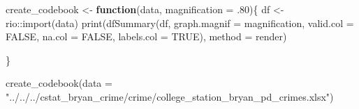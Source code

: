 \documentclass[
  letterpaper,
  DIV=11,
  numbers=noendperiod]{scrartcl}
\newenvironment{Shaded}{\begin{snugshade}}{\end{snugshade}}
\newcommand{\AttributeTok}[1]{\textcolor[rgb]{0.40,0.45,0.13}{#1}}
\newcommand{\ConstantTok}[1]{\textcolor[rgb]{0.56,0.35,0.01}{#1}}
\newcommand{\ControlFlowTok}[1]{\textcolor[rgb]{0.00,0.23,0.31}{\textbf{#1}}}
\newcommand{\DecValTok}[1]{\textcolor[rgb]{0.68,0.00,0.00}{#1}}
\newcommand{\FunctionTok}[1]{\textcolor[rgb]{0.28,0.35,0.67}{#1}}
\newcommand{\NormalTok}[1]{\textcolor[rgb]{0.00,0.23,0.31}{#1}}
\newcommand{\OtherTok}[1]{\textcolor[rgb]{0.00,0.23,0.31}{#1}}
\newcommand{\SpecialCharTok}[1]{\textcolor[rgb]{0.37,0.37,0.37}{#1}}
\newcommand{\StringTok}[1]{\textcolor[rgb]{0.13,0.47,0.30}{#1}}
\begin{document}
\begin{Shaded}
\begin{Highlighting}[]
\NormalTok{create\_codebook }\OtherTok{\textless{}{-}} \ControlFlowTok{function}\NormalTok{(data, }\AttributeTok{magnification =}\NormalTok{ .}\DecValTok{80}\NormalTok{)\{}
\NormalTok{  df }\OtherTok{\textless{}{-}}\NormalTok{ rio}\SpecialCharTok{::}\FunctionTok{import}\NormalTok{(data) }
  \FunctionTok{print}\NormalTok{(}\FunctionTok{dfSummary}\NormalTok{(df, }\AttributeTok{graph.magnif =}\NormalTok{ magnification, }\AttributeTok{valid.col =} \ConstantTok{FALSE}\NormalTok{, }\AttributeTok{na.col =} \ConstantTok{FALSE}\NormalTok{, }\AttributeTok{labels.col =} \ConstantTok{TRUE}\NormalTok{), }\AttributeTok{method =} \StringTok{\textquotesingle{}render\textquotesingle{}}\NormalTok{)}

\NormalTok{\}}

\FunctionTok{create\_codebook}\NormalTok{(}\AttributeTok{data =} \StringTok{"../../../cstat\_bryan\_crime/crime/college\_station\_bryan\_pd\_crimes.xlsx"}\NormalTok{)}
\end{Highlighting}
\end{Shaded}
\end{document}
